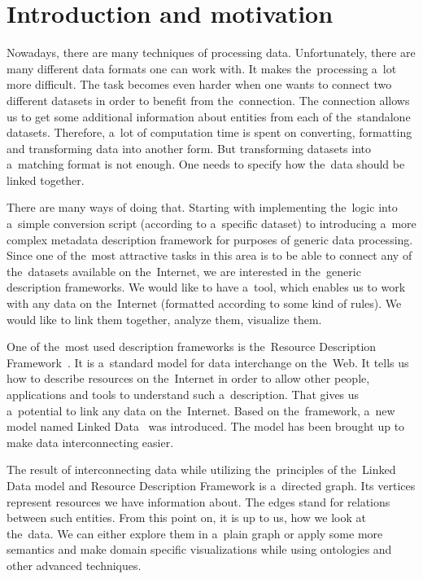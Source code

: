 \chapter*{Introduction and motivation}
\label{ch:preface}
Nowadays, there are many techniques of processing data. Unfortunately, there are many
different data formats one can work with. It makes the~processing a~lot more difficult.
The task becomes even harder when one wants to connect two different datasets in order to
benefit from the~connection. The connection allows us to get some additional information
about entities from each of the~standalone datasets. Therefore, a~lot of computation time is spent
on converting, formatting and transforming data into another form. But transforming datasets
into a~matching format is not enough. One needs to specify how the~data should be linked
together.

There are many ways of doing that. Starting with implementing the~logic into a~simple conversion
script (according to a~specific dataset) to introducing a~more complex metadata description
framework for purposes of generic data processing. Since one of the~most attractive
tasks in this area is to be able to connect any of the~datasets available on the~Internet,
we are interested in the~generic description frameworks. We would like to have 
a~tool, 
which enables us to work with any data on the~Internet (formatted according to some
kind of rules). We would like to link them together, analyze them, visualize 
them.

One of the~most used description frameworks is the~Resource Description Framework~\cite{rdf}.
It is a~standard model for data interchange on the~Web. It tells us how to describe
resources on the~Internet in order to allow other people, applications and tools
to understand such a~description. That gives us a~potential to link any data on the~Internet.
Based on the~framework, a~new model named Linked Data~\cite{ld} was introduced. The model
has been brought up to make data interconnecting easier.

The result of interconnecting data while utilizing the~principles of the~Linked Data model
and Resource Description Framework is a~directed graph. Its vertices represent resources we
have information about. The edges stand for relations between such entities. From this point on,
it is up to us, how we look at the~data. We can either explore them in a~plain graph or apply
some more semantics and make domain specific visualizations while using ontologies
and other advanced techniques.

